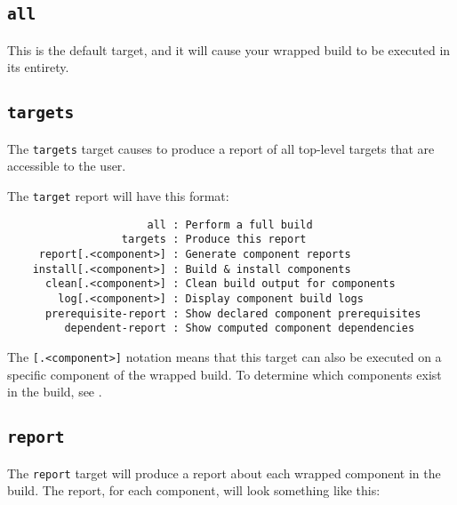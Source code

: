 \subsection{\texttt{all}}\label{lmsbw:target:all}

This is the default target, and it will cause your wrapped build to be
executed in its entirety.

\subsection{\texttt{targets}}

The \texttt{targets} target causes \lmsbw to produce a report of all
top-level targets that are accessible to the user.

The \texttt{target} report will have this format:

\begin{verbatim}
                      all : Perform a full build
                  targets : Produce this report
     report[.<component>] : Generate component reports
    install[.<component>] : Build & install components
      clean[.<component>] : Clean build output for components
        log[.<component>] : Display component build logs
      prerequisite-report : Show declared component prerequisites
         dependent-report : Show computed component dependencies
\end{verbatim}

The \texttt{[.<component>]} notation means that this target can also
be executed on a specific component of the wrapped build.  To
determine which components exist in the build, see
.

\subsection{\texttt{report}}

The \texttt{report} target will produce a report about each wrapped
component in the build.  The report, for each component, will look
something like this:

